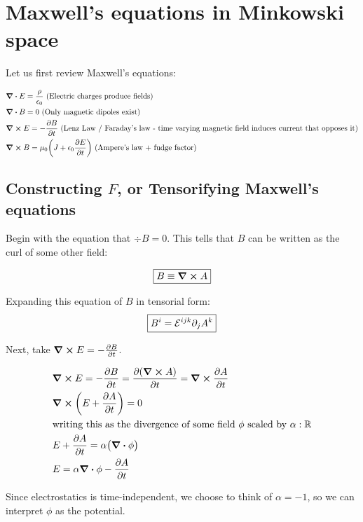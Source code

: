 \chapter{Maxwell's equations in Minkowski space}

Let us first review Maxwell's equations:

\begin{align*}
&\div E = \frac{\rho}{\epsilon_0}~\text{(Electric charges produce fields)}\\
&\div B = 0~\text{(Only magnetic dipoles exist)}\\
&\curl E = - \pdv{B}{t}~\text{(Lenz Law / Faraday's law - time varying magnetic field induces current that opposes it)} \\
&\curl B =  \mu_0 \bigg(J + \epsilon_0 \pdv{E}{t} \bigg)~\text{(Ampere's law + fudge factor)}
\end{align*}

\section{Constructing $F$, or Tensorifying Maxwell's equations}

Begin with the equation that $\div B = 0$. This tells that $B$ can be written
as the curl of some other field:

\begin{equation}
    \boxed{B \equiv \curl A}
\end{equation}

Expanding this equation of $B$ in tensorial form:
\begin{equation}
    \boxed{ B^i = \mathcal{E}^{ijk}  \partial_j A^k }
\end{equation}

Next, take $\curl E = - \pdv{B}{t}$.


\begin{align*}
&\curl E = - \pdv{B}{t} = \pdv{(\curl A)}{t} = \curl{\pdv{A}{t}} \\
&\curl (E + \pdv{A}{t}) = 0 \\
&\text{writing this as the divergence of some field $\phi$ scaled by $\alpha : \mathbb{R}$} \\
&E + \pdv{A}{t} = \alpha \big(\div \phi\big) \\
&E = \alpha \div \phi - \pdv{A}{t}
\end{align*}

Since electrostatics is time-independent, we choose to think of $\alpha = -1$, 
so we can interpret $\phi$ as the potential.

